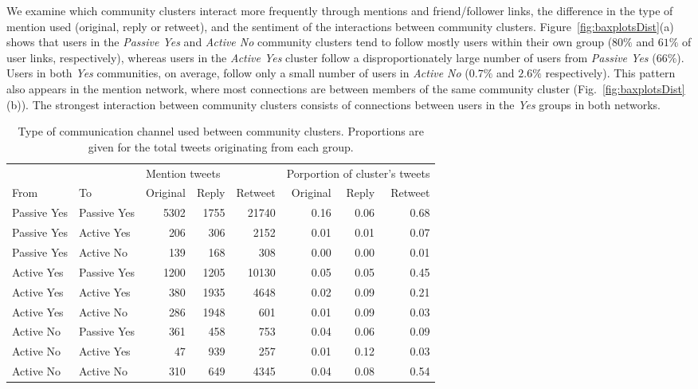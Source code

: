 \documentclass{article}
\begin{document}
We examine which community clusters interact more frequently through
mentions and friend/follower links, the difference in the type of
mention used (original, reply or retweet), and the sentiment of the
interactions between community clusters.
Figure~\ref{fig:baxplotsDist}(a) shows that users in the {\it Passive
  Yes} and {\it Active No} community clusters tend to follow mostly
users within their own group ($80\%$ and $61\%$ of user links,
respectively), whereas users in the {\it Active Yes} cluster follow a
disproportionately large number of users from {\it Passive Yes}
($66\%$). Users in both {\it Yes} communities, on average, follow only
a small number of users in {\it Active No} ($0.7\%$ and $2.6\%$
respectively).  This pattern also appears in the mention network,
where most connections are between members of the same community
cluster (Fig.~\ref{fig:baxplotsDist}(b)). The strongest interaction
between community clusters consists of connections between users in
the {\it Yes} groups in both networks.


\begin{table}[tp]
\centering
\begin{tabular}{ll|rrr|rrr}
   &  & \multicolumn{3}{l|}{Mention tweets} & \multicolumn{3}{l}{Porportion of cluster's tweets} \\
From        & To          & Original     & Reply    & Retweet    & Original          & Reply         & Retweet         \\ \hline
Passive Yes & Passive Yes & 5302         & 1755     & 21740      & 0.16              & 0.06          & 0.68            \\
Passive Yes & Active Yes  & 206          & 306      & 2152       & 0.01              & 0.01          & 0.07            \\
Passive Yes & Active No   & 139          & 168      & 308        & 0.00              & 0.00          & 0.01            \\ \hline
Active Yes  & Passive Yes & 1200         & 1205     & 10130      & 0.05              & 0.05          & 0.45            \\
Active Yes  & Active Yes  & 380          & 1935     & 4648       & 0.02              & 0.09          & 0.21            \\
Active Yes  & Active No   & 286          & 1948     & 601        & 0.01              & 0.09          & 0.03            \\ \hline
Active No   & Passive Yes & 361          & 458      & 753        & 0.04              & 0.06          & 0.09            \\
Active No   & Active Yes  & 47           & 939      & 257        & 0.01              & 0.12          & 0.03            \\
Active No   & Active No   & 310          & 649      & 4345       & 0.04              & 0.08          & 0.54           
\end{tabular}
\caption{Type of communication channel used between community
  clusters. Proportions are given for the total tweets originating
  from each group.}\label{tab:typeCom}
\end{table}
\end{document}
